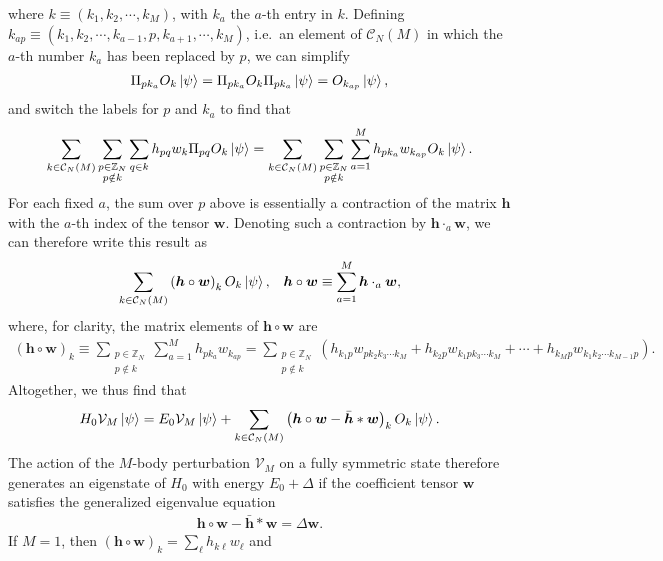 \documentclass[nofootinbib,notitlepage,11pt]{revtex4-2}
\newcommand{\p}[1]{\left(#1\right)} %
\renewcommand{\c}{\cdot} %
\newcommand{\m}{\bm} %
\newcommand{\1}{\mathds{1}}
\newcommand{\C}{\mathcal{C}}
\newcommand{\V}{\mathcal{V}}
\newcommand{\ZZ}{\mathbb{Z}}
\begin{document}
where $k\equiv\p{k_1,k_2,\cdots,k_M}$, with $k_a$ the $a$-th entry in
$k$.  Defining
$k_{ap}\equiv\p{k_1,k_2,\cdots,k_{a-1},p,k_{a+1},\cdots,k_M}$, i.e.~an
element of $\C_N\p{M}$ in which the $a$-th number $k_a$ has been
replaced by $p$, we can simplify
\begin{align}
  \Pi_{p k_a} O_k \ket\psi
  = \Pi_{p k_a} O_k \Pi_{p k_a} \ket\psi
  = O_{k_{ap}}\ket\psi,
\end{align}
and switch the labels for $p$ and $k_a$ to find that
\begin{align}
  \sum_{k\in\C_N\p{M}} \sum_{\substack{p\in\ZZ_N\\p\notin k}} \sum_{q\in k}
  h_{pq} w_k  \Pi_{pq} O_k \ket\psi
  = \sum_{k\in\C_N\p{M}} \sum_{\substack{p\in\ZZ_N\\p\notin k}}
  \sum_{a=1}^M h_{pk_a} w_{k_{ap}} O_k \ket\psi.
\end{align}
For each fixed $a$, the sum over $p$ above is essentially a
contraction of the matrix $\m h$ with the $a$-th index of the tensor
$\m w$.  Denoting such a contraction by $\m h\c_a\m w$, we can
therefore write this result as
\begin{align}
  \sum_{k\in\C_N\p{M}} \p{\m h\circ \m w}_k O_k \ket\psi,
  &&
  \m h\circ\m w \equiv \sum_{a=1}^M \m h\c_a\m w,
\end{align}
where, for clarity, the matrix elements of $\m h\circ\m w$ are
\begin{align}
  \p{\m h\circ\m w}_k
  \equiv \sum_{\substack{p\in\ZZ_N\\p\notin k}} \sum_{a=1}^M
  h_{pk_a} w_{k_{ap}}
  = \sum_{\substack{p\in\ZZ_N\\p\notin k}}
  \p{h_{k_1 p} w_{pk_2k_3\cdots k_M}
    + h_{k_2 p} w_{k_1pk_3\cdots k_M}
    + \cdots + h_{k_M p} w_{k_1k_2\cdots k_{M-1} p}}.
\end{align}
Altogether, we thus find that
\begin{align}
  H_0 \V_M \ket\psi
  = E_0 \V_M \ket\psi + \sum_{k\in\C_N\p{M}}
  \p{\m h\circ\m w - \bar{\m h} * \m w}_k O_k \ket\psi.
  \label{eq:H_VM_psi_end}
\end{align}
The action of the $M$-body perturbation $\V_M$ on a fully symmetric
state therefore generates an eigenstate of $H_0$ with energy
$E_0+\Delta$ if the coefficient tensor $\m w$ satisfies the
generalized eigenvalue equation
\begin{align}
  \m h\circ\m w - \bar{\m h} * \m w = \Delta \m w.
  \label{eq:H_VM_psi_eig}
\end{align}
If $M=1$, then $\p{\m h\circ\m w}_k=\sum_\ell h_{k\ell}w_\ell$ and
\end{document}
